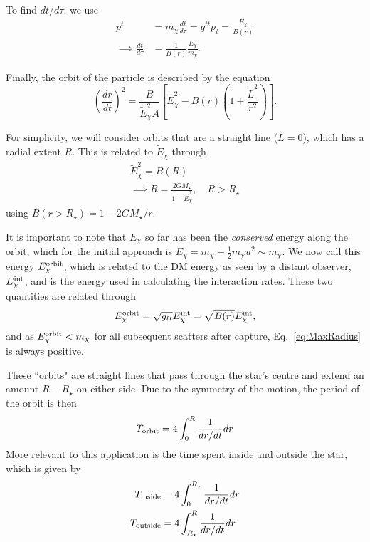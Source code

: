 To find $dt/d\tau$, we use
\begin{align}
    p^t & = m_\chi \frac{dt}{d\tau} = g^{tt}p_t = \frac{E_\chi}{B(r)}\\
    \implies \frac{dt}{d\tau} & = \frac{1}{B(r)}\frac{E_\chi}{m_\chi}.
\end{align}

Finally, the orbit of the particle is described by the equation
\begin{equation}
    \left(\frac{dr}{dt} \right)^2 = \frac{B}{\tilde E_\chi^2 A} \left[\tilde E_\chi^2- B(r) \left(  1 + \frac{\tilde L^2}{r^2} \right) \right].
    \label{eq:drdt2GR}
\end{equation}


For simplicity, we will consider orbits that are a straight line ($\tilde L = 0$), which has a radial extent $R$. This is related to $\tilde E_\chi$ through
\begin{gather}
    \tilde E_\chi^2 = B(R)\label{eq:maxradgeneral}\\
    \implies R = \frac{2 G M_\star}{1 - \tilde E_\chi^2}, \quad R>R_\star
    \label{eq:MaxRadius}
\end{gather}
using $B(r>R_\star) = 1 - 2 G M_\star /r$.

It is important to note that $E_\chi$ so far has been the \textit{conserved} energy along the orbit, 
which for the initial approach is $E_\chi = m_\chi + \frac{1}{2}m_\chi u^2\sim m_\chi$. 
We now call this energy $E_\chi^{\rm orbit}$, which is related to the DM energy as seen by a distant observer, $E_\chi^{\rm int}$, 
and is the energy used in calculating the interaction rates. These two quantities are related through 
\begin{equation}
    E_\chi^{\rm orbit} = \sqrt{g_{tt}} E_\chi^{\rm int} = \sqrt{B(r)}E_\chi^{\rm int},
\end{equation}
and as $E_\chi^{\rm orbit} < m_\chi$ for all subsequent scatters after capture, Eq.~\ref{eq:MaxRadius} is always positive.

These ``orbits" are straight lines that pass through the star's centre and extend an amount $R - R_\star$ on either side. 
Due to the symmetry of the motion, the period of the orbit is then
\begin{equation}
    T_{\rm orbit} = 4 \int_0^R \frac{1}{dr/dt}dr
\end{equation}
More relevant to this application is the time spent inside and outside the star, which is given by
\begin{align}
    T_{\rm inside} & = 4 \int_0^{R_\star} \frac{1}{dr/dt}dr\label{eq:timeinside}\\
    T_{\rm outside} & = 4 \int_{R_\star}^R \frac{1}{dr/dt}dr\label{eq:timeoutside}
\end{align}

